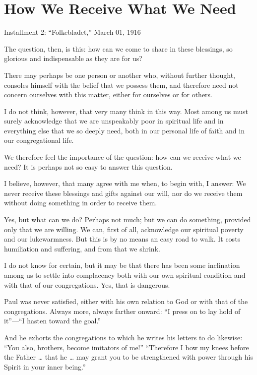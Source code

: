 
\section{How We Receive What We Need}

Installment 2: “Folkebladet,” March 01, 1916

The question, then, is this: how can we come to share in these blessings, so glorious and indispensable as they are for us?

There may perhaps be one person or another who, without further thought, consoles himself with the belief that we possess them, and therefore need not concern ourselves with this matter, either for ourselves or for others.

I do not think, however, that very many think in this way. Most among us must surely acknowledge that we are unspeakably poor in spiritual life and in everything else that we so deeply need, both in our personal life of faith and in our congregational life.

We therefore feel the importance of the question: how can we receive what we need? It is perhaps not so easy to answer this question.

I believe, however, that many agree with me when, to begin with, I answer: We never receive these blessings and gifts against our will, nor do we receive them without doing something in order to receive them.

Yes, but what can we do? Perhaps not much; but we can do something, provided only that we are willing. We can, first of all, acknowledge our spiritual poverty and our lukewarmness. But this is by no means an easy road to walk. It costs humiliation and suffering, and from that we shrink.

I do not know for certain, but it may be that there has been some inclination among us to settle into complacency both with our own spiritual condition and with that of our congregations. Yes, that is dangerous.

Paul was never satisfied, either with his own relation to God or with that of the congregations. Always more, always farther onward: “I press on to lay hold of it”—“I hasten toward the goal.”

And he exhorts the congregations to which he writes his letters to do likewise: “You also, brothers, become imitators of me!” “Therefore I bow my knees before the Father … that he … may grant you to be strengthened with power through his Spirit in your inner being.”

